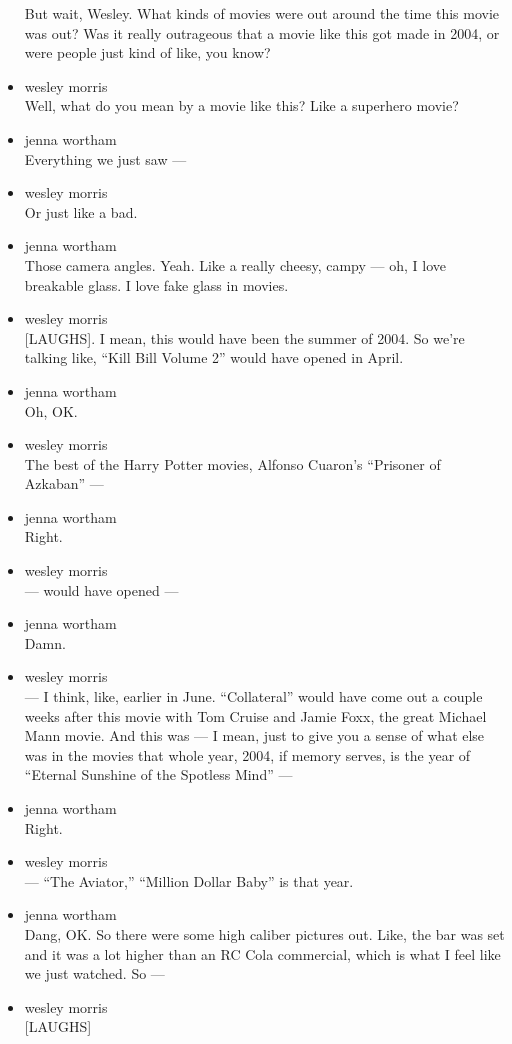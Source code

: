 \begin{itemize}
  But wait, Wesley. What kinds of movies were out around the time this
  movie was out? Was it really outrageous that a movie like this got
  made in 2004, or were people just kind of like, you know?
\item
  wesley morris\\
  Well, what do you mean by a movie like this? Like a superhero movie?
\item
  jenna wortham\\
  Everything we just saw ---
\item
  wesley morris\\
  Or just like a bad.
\item
  jenna wortham\\
  Those camera angles. Yeah. Like a really cheesy, campy --- oh, I love
  breakable glass. I love fake glass in movies.
\item
  wesley morris\\
  {[}LAUGHS{]}. I mean, this would have been the summer of 2004. So
  we're talking like, ``Kill Bill Volume 2'' would have opened in April.
\item
  jenna wortham\\
  Oh, OK.
\item
  wesley morris\\
  The best of the Harry Potter movies, Alfonso Cuaron's ``Prisoner of
  Azkaban'' ---
\item
  jenna wortham\\
  Right.
\item
  wesley morris\\
  --- would have opened ---
\item
  jenna wortham\\
  Damn.
\item
  wesley morris\\
  --- I think, like, earlier in June. ``Collateral'' would have come out
  a couple weeks after this movie with Tom Cruise and Jamie Foxx, the
  great Michael Mann movie. And this was --- I mean, just to give you a
  sense of what else was in the movies that whole year, 2004, if memory
  serves, is the year of ``Eternal Sunshine of the Spotless Mind'' ---
\item
  jenna wortham\\
  Right.
\item
  wesley morris\\
  --- ``The Aviator,'' ``Million Dollar Baby'' is that year.
\item
  jenna wortham\\
  Dang, OK. So there were some high caliber pictures out. Like, the bar
  was set and it was a lot higher than an RC Cola commercial, which is
  what I feel like we just watched. So ---
\item
  wesley morris\\
  {[}LAUGHS{]}


\end{itemize}
